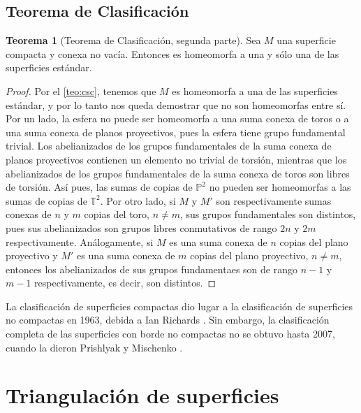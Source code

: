 \documentclass[10pt]{report}
\newcommand{\Toro}{\mathbb{T}^2}
\newcommand{\Proyectivo}{\mathbb{P}^2}
\theoremstyle{definition}
\newtheorem{tma}[defin]{Teorema}
\begin{document}
\section{Teorema de Clasificación}
\begin{tma}[Teorema de Clasificación, segunda parte]
Sea $M$ una superficie compacta y conexa no vacía. Entonces es homeomorfa a una y sólo una de las superficies estándar.
\end{tma}
\begin{proof}
Por el \autoref{teo:csc}, tenemos que $M$ es homeomorfa a una de las superficies estándar, y por lo tanto nos queda demostrar que no son homeomorfas entre sí. Por un lado, la esfera no puede ser homeomorfa a una suma conexa de toros o a una suma conexa de planos proyectivos, pues la esfera tiene grupo fundamental trivial. 
Los abelianizados de los grupos fundamentales de la suma conexa de planos proyectivos contienen un elemento no trivial de torsión, mientras que los abelianizados de los grupos fundamentales de la suma conexa de toros son libres de torsión. Así pues, las sumas de copias de $\Proyectivo$ no pueden ser homeomorfas a las sumas de copias de $\Toro$.
Por otro lado, si $M$ y $M'$ son respectivamente sumas conexas de $n$ y $m$ copias del toro, $n\neq m$, sus grupos fundamentales son distintos, pues sus abelianizados son grupos libres conmutativos de rango $2n$ y $2m$ respectivamente.
Análogamente, si $M$ es una suma conexa de $n$ copias del plano proyectivo y $M'$ es una suma conexa de $m$ copias del plano proyectivo, $n\neq m$, entonces los abelianizados de sus grupos fundamentaes son de rango $n-1$ y $m-1$ respectivamente, es decir, son distintos.
\end{proof}

La clasificación de superficies compactas dio lugar a la clasificación de superficies no compactas en 1963, debida a Ian Richards \cite{richards}. Sin embargo, la clasificación completa de las superficies con borde no compactas no se obtuvo hasta 2007, cuando la dieron Prishlyak y Mischenko \cite{prishlyak}.


\appendix

\chapter{Triangulación de superficies}
\end{document}
